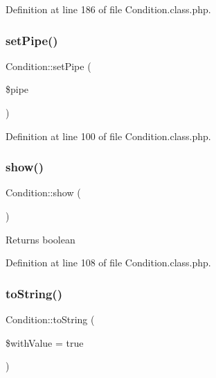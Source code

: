Definition at line 186 of file Condition.\+class.\+php.

\hypertarget{classCondition_a5b8810c0b90532ea2bb73561c6d2f986}{}\label{classCondition_a5b8810c0b90532ea2bb73561c6d2f986} 
\subsubsection{\texorpdfstring{set\+Pipe()}{setPipe()}}
{\footnotesize\ttfamily Condition\+::set\+Pipe (\begin{DoxyParamCaption}\item[{}]{\$pipe }\end{DoxyParamCaption})}



Definition at line 100 of file Condition.\+class.\+php.

\hypertarget{classCondition_a72cefb980f256f8c2ae6801e9c8868b9}{}\label{classCondition_a72cefb980f256f8c2ae6801e9c8868b9} 
\subsubsection{\texorpdfstring{show()}{show()}}
{\footnotesize\ttfamily Condition\+::show (\begin{DoxyParamCaption}{ }\end{DoxyParamCaption})}

\begin{DoxyReturn}{Returns}
boolean 
\end{DoxyReturn}


Definition at line 108 of file Condition.\+class.\+php.

\hypertarget{classCondition_aa4072b1db0e4f4d3a1dae0f1982781e1}{}\label{classCondition_aa4072b1db0e4f4d3a1dae0f1982781e1} 
\subsubsection{\texorpdfstring{to\+String()}{toString()}}
{\footnotesize\ttfamily Condition\+::to\+String (\begin{DoxyParamCaption}\item[{}]{\$with\+Value = {\ttfamily true} }\end{DoxyParamCaption})}


